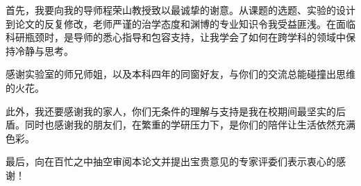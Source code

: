 
\begin{acknowledgements}
  首先，我要向我的导师程荣山教授致以最诚挚的谢意。从课题的选题、实验的设计到论文的反复修改，老师严谨的治学态度和渊博的专业知识令我受益匪浅。在面临科研瓶颈时，是导师的悉心指导和包容支持，让我学会了如何在跨学科的领域中保持冷静与思考。
  \par 感谢实验室的师兄师姐，以及本科四年的同窗好友，与你们的交流总能碰撞出思维的火花。
  \par 此外，我还要感谢我的家人，你们无条件的理解与支持是我在校期间最坚实的后盾。同时也感谢我的朋友们，在繁重的学研压力下，是你们的陪伴让生活依然充满色彩。
  \par 最后，向在百忙之中抽空审阅本论文并提出宝贵意见的专家评委们表示衷心的感谢！
\end{acknowledgements}
